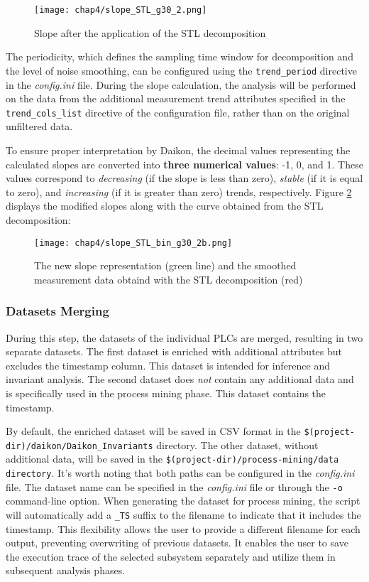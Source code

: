 \begin{figure}[ht]
	\centering
	\texttt{[image: chap4/slope\_STL\_g30\_2.png]}
	\caption{Slope after the application of the STL decomposition}
	\label{fig:4_STL_decomp_results}
\end{figure}

\noindent The periodicity, which defines the sampling time window for decomposition and the level of noise smoothing, can be configured using the \texttt{trend\_period} directive in the \textit{config.ini} file.\newline
During the slope calculation, the analysis will be performed on the data from the additional measurement trend attributes specified in the \texttt{trend\_cols\_list} directive of the configuration file, rather than on the original unfiltered data.

\bigskip
To ensure proper interpretation by Daikon, the decimal values representing the calculated slopes are converted into \textbf{three numerical values}: -1, 0, and 1. These values correspond to \textit{decreasing} (if the slope is less than zero), \textit{stable} (if it is equal to zero), and \textit{increasing} (if it is greater than zero) trends, respectively. Figure \ref{fig:4_slope_daikon} displays the modified slopes along with the curve obtained from the STL decomposition:

\begin{figure}[ht]
	\centering
	\texttt{[image: chap4/slope\_STL\_bin\_g30\_2b.png]}
	\caption{The new slope representation (green line) and the smoothed measurement data obtaind with the STL decomposition (red)}
	\label{fig:4_slope_daikon}
\end{figure}

\subsubsection{Datasets Merging}
\label{subsubsec:4_dataset_merging}
During this step, the datasets of the individual PLCs are merged, resulting in two separate datasets. The first dataset is enriched with additional attributes but excludes the timestamp column. This dataset is intended for inference and invariant analysis. The second dataset does \textit{not} contain any additional data and is specifically used in the process mining phase. This dataset contains the timestamp.

\bigskip
By default, the enriched dataset will be saved in CSV format in the \texttt{\$(project-dir)/daikon/Daikon\_Invariants} directory. The other dataset, without additional data, will be saved in the \texttt{\$(project-dir)/process-mining/data directory}. It's worth noting that both paths can be configured in the \textit{config.ini} file. The dataset name can be specified in the \textit{config.ini} file or through the \texttt{-o} command-line option. When generating the dataset for process mining, the script will automatically add a \texttt{\_TS} suffix to the filename to indicate that it includes the timestamp. This flexibility allows the user to provide a different filename for each output, preventing overwriting of previous datasets. It enables the user to save the execution trace of the selected subsystem separately and utilize them in subsequent analysis phases.

